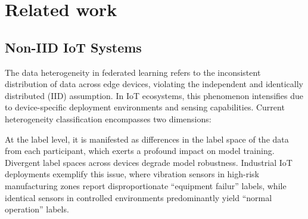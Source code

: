 \documentclass[journal,twoside,web]{ieeecolor}
\begin{document}



\section{Related work}

\subsection{ Non-IID IoT Systems}


The data heterogeneity in federated learning refers to the inconsistent distribution of data across edge devices, violating the independent and identically distributed (IID) assumption\cite{xiong1}. In IoT ecosystems, this phenomenon intensifies due to device-specific deployment environments and sensing capabilities. Current heterogeneity classification encompasses two dimensions:

At the label level, it is manifested as differences in the label space of the data from each participant, which exerts a profound impact on model training\cite{tii-Heterogeneous}. Divergent label spaces across devices degrade model robustness. Industrial IoT deployments exemplify this issue, where vibration sensors in high-risk manufacturing zones report disproportionate ``equipment failur'' labels, while identical sensors in controlled environments predominantly yield ``normal operation'' labels. 
\end{document}
